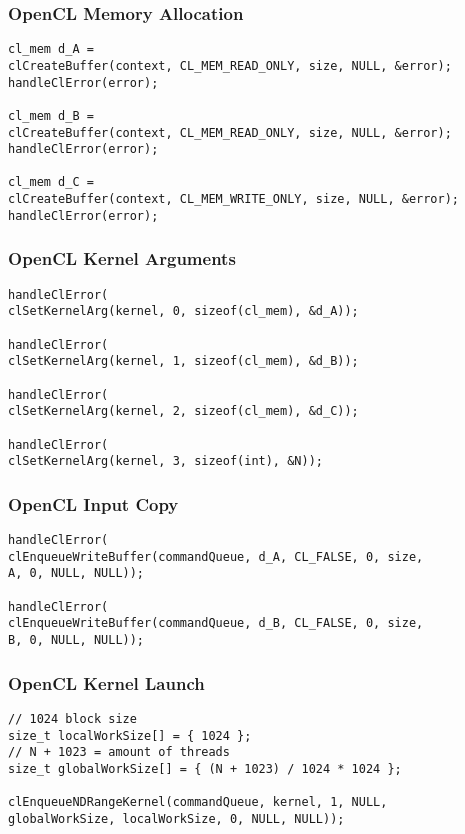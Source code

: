 \documentclass[main.tex,fontsize=8pt,paper=a4,paper=portrait,DIV=calc,]{scrartcl}
\begin{document}
\subsubsection{OpenCL Memory Allocation}
\begin{lstlisting}
cl_mem d_A =
clCreateBuffer(context, CL_MEM_READ_ONLY, size, NULL, &error);
handleClError(error);

cl_mem d_B =
clCreateBuffer(context, CL_MEM_READ_ONLY, size, NULL, &error);
handleClError(error);

cl_mem d_C =
clCreateBuffer(context, CL_MEM_WRITE_ONLY, size, NULL, &error);
handleClError(error);
\end{lstlisting}

\subsubsection{OpenCL Kernel Arguments}
\begin{lstlisting}
handleClError(
clSetKernelArg(kernel, 0, sizeof(cl_mem), &d_A));

handleClError(
clSetKernelArg(kernel, 1, sizeof(cl_mem), &d_B));

handleClError(
clSetKernelArg(kernel, 2, sizeof(cl_mem), &d_C));

handleClError(
clSetKernelArg(kernel, 3, sizeof(int), &N));
\end{lstlisting}

\subsubsection{OpenCL Input Copy}
\begin{lstlisting}
handleClError(
clEnqueueWriteBuffer(commandQueue, d_A, CL_FALSE, 0, size,
A, 0, NULL, NULL));

handleClError(
clEnqueueWriteBuffer(commandQueue, d_B, CL_FALSE, 0, size,
B, 0, NULL, NULL));
\end{lstlisting}

\subsubsection{OpenCL Kernel Launch}
\begin{lstlisting}
// 1024 block size
size_t localWorkSize[] = { 1024 };
// N + 1023 = amount of threads
size_t globalWorkSize[] = { (N + 1023) / 1024 * 1024 };

clEnqueueNDRangeKernel(commandQueue, kernel, 1, NULL,
globalWorkSize, localWorkSize, 0, NULL, NULL));
\end{lstlisting}
\end{document}

